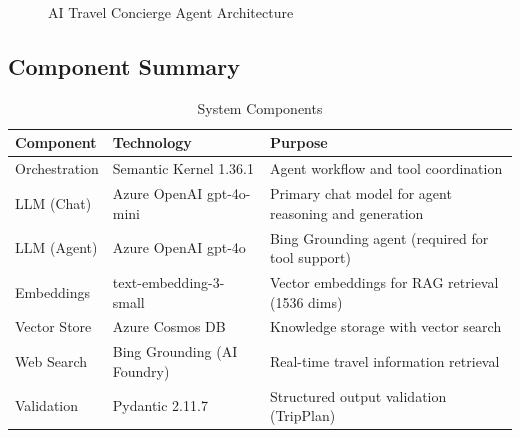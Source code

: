 \documentclass[11pt,a4paper]{article}
\begin{document}
\begin{figure}[H]
    \caption{AI Travel Concierge Agent Architecture}
    \label{fig:architecture}
\end{figure}

\subsection{Component Summary}

\begin{table}[H]
\centering
\caption{System Components}
\begin{tabular}{llp{7cm}}
\toprule
\textbf{Component} & \textbf{Technology} & \textbf{Purpose} \\
\midrule
Orchestration & Semantic Kernel 1.36.1 & Agent workflow and tool coordination \\
LLM (Chat) & Azure OpenAI gpt-4o-mini & Primary chat model for agent reasoning and generation \\
LLM (Agent) & Azure OpenAI gpt-4o & Bing Grounding agent (required for tool support) \\
Embeddings & text-embedding-3-small & Vector embeddings for RAG retrieval (1536 dims) \\
Vector Store & Azure Cosmos DB & Knowledge storage with vector search \\
Web Search & Bing Grounding (AI Foundry) & Real-time travel information retrieval \\
Validation & Pydantic 2.11.7 & Structured output validation (TripPlan) \\
\bottomrule
\end{tabular}
\end{table}
\end{document}
